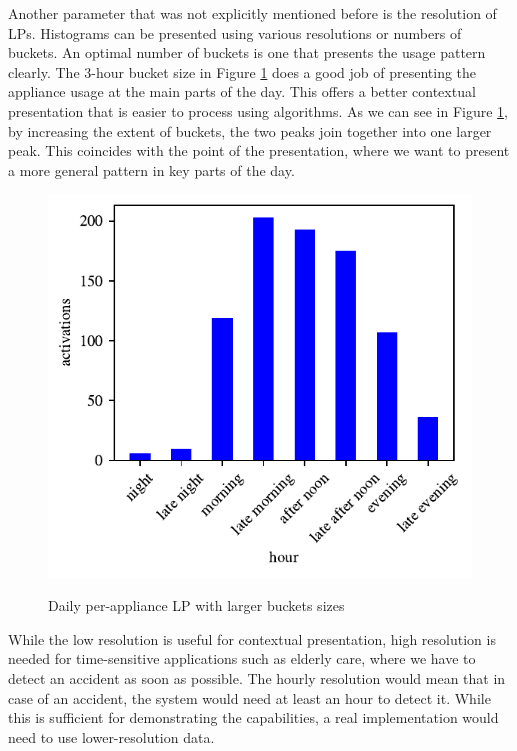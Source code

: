 Another parameter that was not explicitly mentioned before is the resolution of LPs. 
Histograms can be presented using various resolutions or numbers of buckets.
An optimal number of buckets is one that presents the usage pattern clearly.
The 3-hour bucket size in Figure \ref{fig:4hours} does a good job of presenting the appliance usage at the main parts of the day.
This offers a better contextual presentation that is easier to process using algorithms.
As we can see in Figure \ref{fig:4hours}, by increasing the extent of buckets, the two peaks join together into one larger peak.
This coincides with the point of the presentation, where we want to present a more general pattern in key parts of the day.

\begin{figure}[H]
	\centering
	\caption{Daily per-appliance LP with larger buckets sizes}
	\includegraphics[]{../Figures/LPS/3_hours.pdf}
	\label{fig:4hours}
\end{figure}

While the low resolution is useful for contextual presentation,
high resolution is needed for time-sensitive applications such as elderly care,
where we have to detect an accident as soon as possible.
The hourly resolution would mean that in case of an accident, the system would need at least an hour to detect it.
While this is sufficient for demonstrating the capabilities, a real implementation would need to use lower-resolution data.

